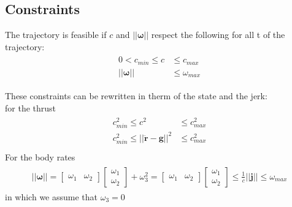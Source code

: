 \subsection{Constraints}
The trajectory is feasible if $c$ and $||\boldsymbol{\omega}||$ respect the following for all t of the trajectory:
\begin{align}
\begin{split}
0 < c_{min} \leq c &\leq c_{max}\\
||\boldsymbol{\omega}|| & \leq \omega_{max}
\end{split}
\end{align}

These constraints can be rewritten in therm of the state and the jerk:\\
for the thrust
\begin{align}
\begin{split}
 c_{min}^2 \leq c^2 &\leq c_{max}^2\\
 c_{min}^2 \leq ||\ddot{\boldsymbol{r}} - \boldsymbol{g}||^2 &\leq c_{max}^2\\
\end{split}
\label{eq:feasib_thrust}
\end{align}
For the body rates
\begin{align}
\begin{split}
||\boldsymbol{\omega}|| =
 {\begin{bmatrix}
\omega_1 & \omega_2
\end{bmatrix}}
 {\begin{bmatrix}
\omega_1 \\[10pt]
\omega_2
\end{bmatrix}} + \omega_3^2 = {\begin{bmatrix}
\omega_1 & \omega_2
\end{bmatrix}}
 {\begin{bmatrix}
\omega_1 \\[10pt]
\omega_2
\end{bmatrix}}  \leq \frac{1}{c}||\boldsymbol{j}||  \leq \omega_{max} 
\end{split}
\label{eq:feasib_bodyrates}
\end{align}
in which we assume that $\omega_3 = 0$

